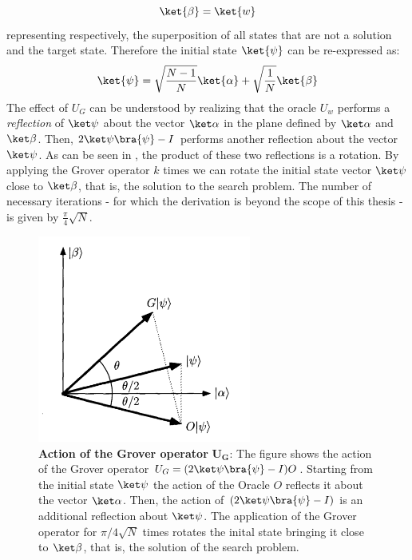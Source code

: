 \vspace{-0.5cm}
\begin{equation}
  \ket{\beta} = \ket{w}
\end{equation}
representing respectively, the superposition of all states that are not a solution and the target state. Therefore the initial state $\ket{\psi}$ can be re-expressed as:
\begin{equation}
  \ket{\psi}= \sqrt{\frac{N-1}{N}}\ket{\alpha} + \sqrt{\frac{1}{N}}\ket{\beta}
\end{equation}
The effect of $U_G$ can be understood by realizing that the oracle $U_w$ performs a \textit{reflection} of $\kpsi$ about the vector $\kalpha$ in the plane defined by $\kalpha$ and $\kbeta$. Then, $2\kpsi\bra{\psi}-I$ performs another reflection about the vector $\kpsi$. As can be seen in , the product of these two reflections is a rotation. By applying the Grover operator $k$ times we can rotate the initial state vector $\kpsi$ close to $\kbeta$, that is, the solution to the search problem. The number of necessary iterations - for which the derivation is beyond the scope of this thesis - is given by $\frac{\pi}{4}\sqrt{N}$.
\begin{figure}[ht]
  \centering
  \includegraphics[width=70mm]{figures/chapter1/grover_reflection}
  \caption[Action of the Grover operator]{\textbf{Action of the Grover operator }$\bm{U_G}$: The figure shows the action of the Grover operator $U_G=(2\kpsi\bra{\psi} -I)O$. Starting from the initial state $\kpsi$ the action of the Oracle $O$ reflects it about the vector $\kalpha$. Then, the action of $(2\kpsi\bra{\psi}-I)$ is an additional reflection about $\kpsi$. The application of the Grover operator for $\pi/4\sqrt{N}$ times rotates the inital state bringing it close to $\kbeta$, that is, the solution of the search problem.}
  \label{fig:grover_operator}
\end{figure}


